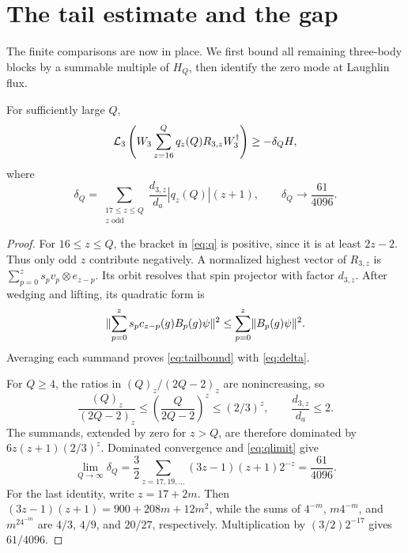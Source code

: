 \section{The tail estimate and the gap}
\label{sec:finish}
The finite comparisons are now in place. We first bound all remaining three-body blocks by a summable multiple of $H_Q$, then identify the zero mode at Laughlin flux.

\begin{lemma}\label{lem:tail}
For sufficiently large $Q$,
\begin{equation}\label{eq:tailbound}
 \mathcal L_3\left(W_3\sum_{z=16}^Qq_z(Q)R_{3,z}W_3^\dagger\right)
 \ge-\delta_QH,
\end{equation}
where
\begin{equation}\label{eq:delta}
 \delta_Q=\sum_{\substack{17\le z\le Q\\z\text{ odd}}}
       \frac{d_{3,z}}{d_a}|q_z(Q)|(z+1),\qquad
 \delta_Q\longrightarrow\frac{61}{4096}.
\end{equation}
\end{lemma}
\begin{proof}
For $16\le z\le Q$, the bracket in \eqref{eq:q} is positive, since it is at least $2z-2$. Thus only odd $z$ contribute negatively. A normalized highest vector of $R_{3,z}$ is $\sum_{p=0}^zs_pv_p\otimes e_{z-p}$. Its orbit resolves that spin projector with factor $d_{3,z}$. After wedging and lifting, its quadratic form is
\[
 \lVert \sum_{p=0}^zs_pc_{z-p}(g)B_p(g)\psi\rVert^2
 \le\sum_{p=0}^z\lVert B_p(g)\psi\rVert^2.
\]
Averaging each summand proves \eqref{eq:tailbound} with \eqref{eq:delta}.

For $Q\ge4$, the ratios in $(Q)_z/(2Q-2)_z$ are nonincreasing, so
\[
 \frac{(Q)_z}{(2Q-2)_z}\le\left(\frac Q{2Q-2}\right)^z
 \le(2/3)^z,\qquad \frac{d_{3,z}}{d_a}\le2.
\]
The summands, extended by zero for $z>Q$, are therefore dominated by
$6z(z+1)(2/3)^z$. Dominated convergence and \eqref{eq:qlimit} give
\[
 \lim_{Q\to\infty}\delta_Q
 =\frac32\sum_{z=17,19,\ldots}(3z-1)(z+1)2^{-z}
 =\frac{61}{4096}.
\]
For the last identity, write $z=17+2m$. Then
$(3z-1)(z+1)=900+208m+12m^2$, while the sums of $4^{-m}$,
$m4^{-m}$, and $m^24^{-m}$ are $4/3$, $4/9$, and $20/27$,
respectively. Multiplication by $(3/2)2^{-17}$ gives $61/4096$.
\end{proof}

